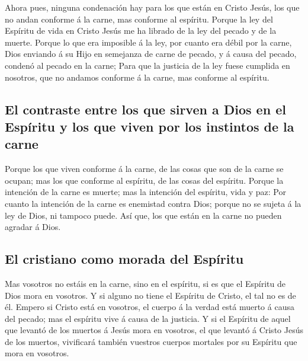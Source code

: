  Ahora pues, ninguna condenación hay para los que están en
Cristo Jesús, los que no andan conforme á la carne, mas conforme al
espíritu.  Porque la ley del Espíritu de vida en Cristo
Jesús me ha librado de la ley del pecado y de la muerte. 
Porque lo que era imposible á la ley, por cuanto era débil por la carne,
Dios enviando á su Hijo en semejanza de carne de pecado, y á causa del
pecado, condenó al pecado en la carne;  Para que la justicia
de la ley fuese cumplida en nosotros, que no andamos conforme á la
carne, mas conforme al espíritu.

\hypertarget{el-contraste-entre-los-que-sirven-a-dios-en-el-espuxedritu-y-los-que-viven-por-los-instintos-de-la-carne}{%
\subsection{El contraste entre los que sirven a Dios en el Espíritu y
los que viven por los instintos de la
carne}\label{el-contraste-entre-los-que-sirven-a-dios-en-el-espuxedritu-y-los-que-viven-por-los-instintos-de-la-carne}}

 Porque los que viven conforme á la carne, de las cosas que
son de la carne se ocupan; mas los que conforme al espíritu, de las
cosas del espíritu.  Porque la intención de la carne es
muerte; mas la intención del espíritu, vida y paz:  Por
cuanto la intención de la carne es enemistad contra Dios; porque no se
sujeta á la ley de Dios, ni tampoco puede.  Así que, los que
están en la carne no pueden agradar á Dios.

\hypertarget{el-cristiano-como-morada-del-espuxedritu}{%
\subsection{El cristiano como morada del
Espíritu}\label{el-cristiano-como-morada-del-espuxedritu}}

 Mas vosotros no estáis en la carne, sino en el espíritu, si
es que el Espíritu de Dios mora en vosotros. Y si alguno no tiene el
Espíritu de Cristo, el tal no es de él.  Empero si Cristo
está en vosotros, el cuerpo á la verdad está muerto á causa del pecado;
mas el espíritu vive á causa de la justicia.  Y si el
Espíritu de aquel que levantó de los muertos á Jesús mora en vosotros,
el que levantó á Cristo Jesús de los muertos, vivificará también
vuestros cuerpos mortales por su Espíritu que mora en vosotros.

